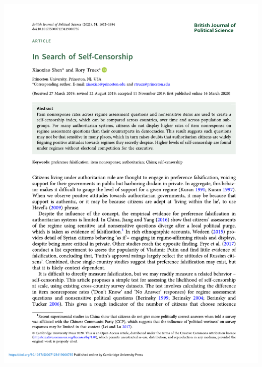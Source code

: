 \documentclass[
  10pt,
  ignorenonframetext,
]{beamer}
\begin{document}
\begin{frame}
\begin{center}\includegraphics[width=0.9\linewidth]{Figs/Examples/truex_cover} \end{center}
\end{frame}
\end{document}
